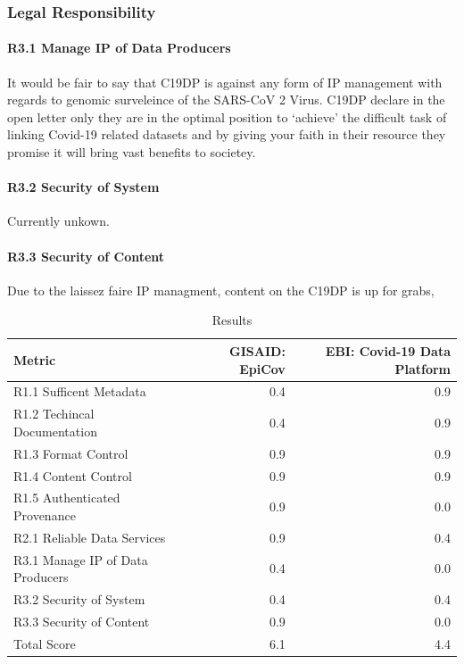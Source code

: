 \documentclass{article}
\begin{document}
\hypertarget{legal-responsibility-2}{%
\subsubsection{Legal Responsibility}\label{legal-responsibility-2}}

\hypertarget{r3.1-manage-ip-of-data-producers-1}{%
\paragraph{R3.1 Manage IP of Data
Producers}\label{r3.1-manage-ip-of-data-producers-1}}

It would be fair to say that C19DP is against any form of IP management
with regards to genomic surveleince of the SARS-CoV 2 Virus. C19DP
declare in the open letter only they are in the optimal position to
`achieve' the difficult task of linking Covid-19 related datasets and by
giving your faith in their resource they promise it will bring vast
benefits to societey.

\hypertarget{r3.2-security-of-system-1}{%
\paragraph{R3.2 Security of System}\label{r3.2-security-of-system-1}}

Currently unkown.

\hypertarget{r3.3-security-of-content-1}{%
\paragraph{R3.3 Security of Content}\label{r3.3-security-of-content-1}}

Due to the laissez faire IP managment, content on the C19DP is up for
grabs,

\begin{table}[H]

\caption{\label{tab:fig3}Results}
\centering
\begin{tabular}[t]{l|r|r}
\hline
Metric & GISAID: EpiCov & EBI: Covid-19 Data Platform\\
\hline
R1.1 Sufficent Metadata & 0.4 & 0.9\\
\hline
R1.2 Techincal Documentation & 0.4 & 0.9\\
\hline
R1.3 Format Control & 0.9 & 0.9\\
\hline
R1.4 Content Control & 0.9 & 0.9\\
\hline
R1.5  Authenticated Provenance & 0.9 & 0.0\\
\hline
R2.1 Reliable Data Services & 0.9 & 0.4\\
\hline
R3.1 Manage IP of Data Producers & 0.4 & 0.0\\
\hline
R3.2 Security of System & 0.4 & 0.4\\
\hline
R3.3 Security of Content & 0.9 & 0.0\\
\hline
Total Score & 6.1 & 4.4\\
\hline
\end{tabular}
\end{table}
\end{document}
